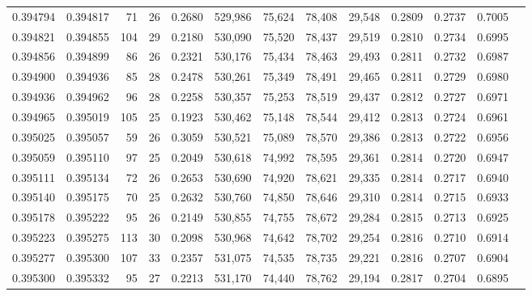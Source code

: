 \begin{tabular}{rrrrrrrrrrrrr}
0.394794 & 0.394817 &    71 &  26 &                                     0.2680 & 529,986 &  75,624 &  78,408 &  29,548 & 0.2809 & 0.2737 & 0.7005 \\
0.394821 & 0.394855 &   104 &  29 &                                     0.2180 & 530,090 &  75,520 &  78,437 &  29,519 & 0.2810 & 0.2734 & 0.6995 \\
0.394856 & 0.394899 &    86 &  26 &                                     0.2321 & 530,176 &  75,434 &  78,463 &  29,493 & 0.2811 & 0.2732 & 0.6987 \\
0.394900 & 0.394936 &    85 &  28 &                                     0.2478 & 530,261 &  75,349 &  78,491 &  29,465 & 0.2811 & 0.2729 & 0.6980 \\
0.394936 & 0.394962 &    96 &  28 &                                     0.2258 & 530,357 &  75,253 &  78,519 &  29,437 & 0.2812 & 0.2727 & 0.6971 \\
0.394965 & 0.395019 &   105 &  25 &                                     0.1923 & 530,462 &  75,148 &  78,544 &  29,412 & 0.2813 & 0.2724 & 0.6961 \\
0.395025 & 0.395057 &    59 &  26 &                                     0.3059 & 530,521 &  75,089 &  78,570 &  29,386 & 0.2813 & 0.2722 & 0.6956 \\
0.395059 & 0.395110 &    97 &  25 &                                     0.2049 & 530,618 &  74,992 &  78,595 &  29,361 & 0.2814 & 0.2720 & 0.6947 \\
0.395111 & 0.395134 &    72 &  26 &                                     0.2653 & 530,690 &  74,920 &  78,621 &  29,335 & 0.2814 & 0.2717 & 0.6940 \\
0.395140 & 0.395175 &    70 &  25 &                                     0.2632 & 530,760 &  74,850 &  78,646 &  29,310 & 0.2814 & 0.2715 & 0.6933 \\
0.395178 & 0.395222 &    95 &  26 &                                     0.2149 & 530,855 &  74,755 &  78,672 &  29,284 & 0.2815 & 0.2713 & 0.6925 \\
0.395223 & 0.395275 &   113 &  30 &                                     0.2098 & 530,968 &  74,642 &  78,702 &  29,254 & 0.2816 & 0.2710 & 0.6914 \\
0.395277 & 0.395300 &   107 &  33 &                                     0.2357 & 531,075 &  74,535 &  78,735 &  29,221 & 0.2816 & 0.2707 & 0.6904 \\
0.395300 & 0.395332 &    95 &  27 &                                     0.2213 & 531,170 &  74,440 &  78,762 &  29,194 & 0.2817 & 0.2704 & 0.6895 \\

\end{tabular}
